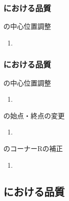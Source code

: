 \subsubsection{\EndFaceOutCChamferMilling における品質}

\begin{Issues}{\EndFaceOutCChamferMilling の中心位置調整\TBW}
\begin{enumerate}[label=\sarrow]
\item[{\sarrow[red]}]
\end{enumerate}
\end{Issues}

\subsubsection{\EndFaceInCChamferMilling における品質}

\begin{Issues}{\EndFaceInCChamferMilling の中心位置調整\TBW}
\begin{enumerate}[label=\sarrow]
\item[{\sarrow[red]}]
\end{enumerate}
\end{Issues}

\begin{Issues}{\EndFaceInCChamferMilling の始点・終点の変更\TBW}
\begin{enumerate}[label=\sarrow]
\item[{\sarrow[red]}]
\end{enumerate}
\end{Issues}

\begin{Issues}{\EndFaceInCChamferMilling のコーナーRの補正\TBW}
\begin{enumerate}[label=\sarrow]
\item[{\sarrow[red]}]
\end{enumerate}
\end{Issues}


\subsection{\EndFaceBoringMilling における品質}

